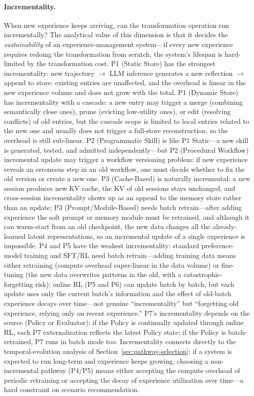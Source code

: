 \paragraph{Incrementality.} When new experience keeps arriving, can the transformation operation run incrementally? The analytical value of this dimension is that it decides the \emph{sustainability} of an experience-management system---if every new experience requires redoing the transformation from scratch, the system's lifespan is hard-limited by the transformation cost. P1 (Static Store) has the strongest incrementality: new trajectory $\rightarrow$ LLM inference generates a new reflection $\rightarrow$ append to store; existing entries are unaffected, and the overhead is linear in the new experience volume and does not grow with the total. P1 (Dynamic Store) has incrementality with a cascade: a new entry may trigger a merge (combining semantically close ones), prune (evicting low-utility ones), or edit (resolving conflicts) of old entries, but the cascade scope is limited to local entries related to the new one and usually does not trigger a full-store reconstruction, so the overhead is still sub-linear. P2 (Programmatic Skill) is like P1 Static---a new skill is generated, tested, and admitted independently---but P2 (Procedural Workflow) incremental update may trigger a workflow versioning problem: if new experience reveals an erroneous step in an old workflow, one must decide whether to fix the old version or create a new one. P3 (Cache-Based) is naturally incremental: a new session produces new KV cache, the KV of old sessions stays unchanged, and cross-session incrementality shows up as an append to the memory store rather than an update; P3 (Prompt/Module-Based) needs batch retrain---after adding experience the soft prompt or memory module must be retrained, and although it can warm-start from an old checkpoint, the new data changes all the already-learned latent representations, so an incremental update of a single experience is impossible. P4 and P5 have the weakest incrementality: standard preference-model training and SFT/RL need batch retrain---adding training data means either retraining (compute overhead super-linear in the data volume) or fine-tuning (the new data overwrites patterns in the old, with a catastrophic-forgetting risk); online RL (P5 and P6) can update batch by batch, but each update uses only the current batch's information and the effect of old-batch experience decays over time---not genuine ``incrementality'' but ``forgetting old experience, relying only on recent experience.'' P7's incrementality depends on the source (Policy or Evaluator): if the Policy is continually updated through online RL, each P7 externalization reflects the latest Policy state; if the Policy is batch-retrained, P7 runs in batch mode too. Incrementality connects directly to the temporal-evolution analysis of Section~\ref{sec:pathway-selection}: if a system is expected to run long-term and experience keeps growing, choosing a non-incremental pathway (P4/P5) means either accepting the compute overhead of periodic retraining or accepting the decay of experience utilization over time---a hard constraint on scenario recommendation.

